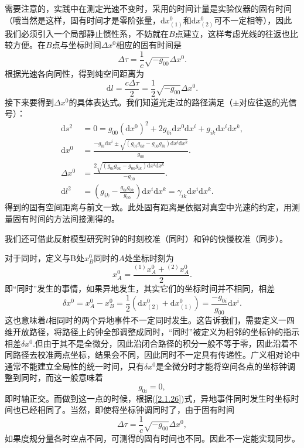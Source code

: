 \documentclass[11pt, a4paper, oneside, onecolumn]{ctexart}
\numberwithin{equation}{subsection}
\begin{document}
需要注意的，实践中在测定光速不变时，采用的时间计量是实验仪器的固有时间（哦当然是这样，固有时间才是零阶张量，$\mathrm{d}x^{0}_{\left(1\right)}$和$\mathrm{d}x^{0}_{\left(2\right)}$可不一定相等），因此我们必须引入一个局部静止惯性系，不妨就在$B$点建立，这样考虑光线的往返也比较方便。在$B$点与坐标时间$\Delta{}x^{0}$相应的固有时间是
\begin{equation}
\Delta{}\tau=\frac{1}{c}\sqrt{-g_{00}}\Delta{}x^{0}.
\end{equation}
根据光速各向同性，得到纯空间距离为
\begin{equation}
\mathrm{d}l=\frac{c\Delta{}\tau}{2}=\frac12\sqrt{-g_{00}}\Delta{}x^{0}.
\end{equation}
接下来要得到$\Delta{}x^{0}$的具体表达式。我们知道光走过的路径满足（$\pm$对应往返的光信号）：
\begin{align}
\mathrm{d}s^{2}&=0=g_{00}\left(\mathrm{d}x^{0}\right)^{2}+2g_{0i}\mathrm{d}x^{0}\mathrm{d}x^{i}+g_{ik}\mathrm{d}x^{i}\mathrm{d}x^{k},\\
\mathrm{d}x^{0}&=\frac{-g_{0i}\mathrm{d}x^{i}\pm\sqrt{\left(g_{0i}g_{0k}-g_{00}g_{ik}\right)\mathrm{d}x^{i}\mathrm{d}x^{k}}}{g_{00}}.\label{往返}\\
\Delta{}x^{0}&=\frac{2\sqrt{\left(g_{0i}g_{0k}-g_{00}g_{ik}\right)\mathrm{d}x^{i}\mathrm{d}x^{k}}}{-g_{00}}.\\
\mathrm{d}l^{2}&=\left(g_{ik}-\frac{g_{0i}g_{0k}}{g_{00}}\right)\mathrm{d}x^{i}\mathrm{d}x^{k}=\gamma_{ik}\mathrm{d}x^{i}\mathrm{d}x^{k}.
\end{align}
得到的固有空间距离与前文一致。此处固有距离是依据对真空中光速的约定，用测量固有时间的方法间接测得的。

我们还可借此反射模型研究时钟的时刻校准（同时）和钟的快慢校准（同步）。

对于同时，定义与B处$x_{B}^{0}$同时的$A$处坐标时刻为
\begin{equation}
x_{A}^{0}=\frac{{}^{\left(1\right)}x_{A}^{0}+{}^{\left(2\right)}x_{A}^{0}}{2}.
\end{equation}
即“同时”发生的事情，如果异地发生，其实它们的坐标时间并不相同，相差
\begin{equation}
\delta{}x^{0}=x_{A}^{0}-x_{B}^{0}=\frac12\left(\mathrm{d}x^{0}_{\left(2\right)}+\mathrm{d}x^{0}_{\left(1\right)}\right)=\frac{-g_{0i}}{g_{00}}\mathrm{d}x^{i}.\label{2.1.26}
\end{equation}
这也意味着$t$相同时的两个异地事件不一定同时发生。这告诉我们，需要定义一四维开放路径，将路径上的钟全部调整成同时，“同时”被定义为相邻的坐标钟的指示相差$\delta{}x^{0}$.但由于其不是全微分，因此沿闭合路径的积分一般不等于零，因此沿着不同路径去校准两点坐标，结果会不同，因此同时不一定具有传递性。广义相对论中通常不能建立全局性的统一时间，只有$\delta{}x^{0}$是全微分时才能将空间各点的坐标钟调整到同时，而这一般意味着
\begin{equation}
g_{0i}=0,
\end{equation}
即时轴正交。而做到这一点的时候，根据(\ref{2.1.26})式，异地事件同时发生时坐标时间也已经相同了。当然，即使将坐标钟调同时了，由于固有时间
\begin{equation}
\Delta{}\tau=\frac{1}{c}\sqrt{-g_{00}}\Delta{}x^{0},
\end{equation}
如果度规分量各时空点不同，可测得的固有时间也不同。因此不一定能实现同步。
\end{document}
